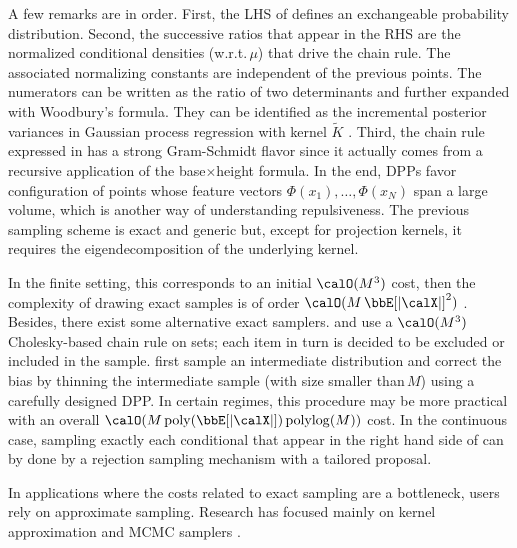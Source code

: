 \documentclass[twoside,11pt]{article}
\begin{document}
        A few remarks are in order.
        First, the LHS of  defines an exchangeable probability distribution.
        Second, the successive ratios that appear in the RHS are the normalized conditional densities (w.r.t.\,$\mu$) that drive the chain rule.
        The associated normalizing constants are independent of the previous points.
        The numerators can be written as the ratio of two determinants and further expanded with Woodbury's formula.
        They can be identified as the incremental posterior variances in Gaussian process regression with kernel $\tilde{K}$ \citep[Equation\,2.26]{RaWi06}.
        Third, the chain rule expressed in  has a strong Gram-Schmidt flavor since it actually comes from a recursive application of the base$\times$height formula.
        In the end, DPPs favor configuration of points whose feature vectors $\Phi(x_1),\dots, \Phi(x_N)$ span a large volume, which is another way of understanding repulsiveness.
        The previous sampling scheme is exact and generic but, except for projection kernels, it requires the eigendecomposition of the underlying kernel.

        In the finite setting, this corresponds to an initial $\calO(M^3)$ cost, then the complexity of drawing exact samples is of order $\calO(M\Expe{|\calX|}^2)$
        \citep[see, e.g.,][]{Gil14,TrBaAm18}.
        Besides, there exist some alternative exact samplers.
        \citet{Pou19} and  use a $\calO(M^3)$ Cholesky-based chain rule on sets; each item in turn is decided to be excluded or included in the sample.
         first sample an intermediate distribution and correct the bias by thinning the intermediate sample (with size smaller than\,$M$) using a carefully designed DPP.
        In certain regimes, this procedure may be more practical with an overall
        $\calO(M\operatorname{poly}(\Expe{|\calX|})\operatorname{polylog}(M))$ cost.
        In the continuous case, sampling exactly each conditional that appear in the right hand side of  can by done by a rejection sampling mechanism with a tailored proposal.

        In applications where the costs related to exact sampling are a bottleneck, users rely on approximate sampling.
        Research has focused mainly on kernel approximation \citep{AKFT13} and MCMC samplers \citep{AnGhRe16, LiJeSr16c, GaBaVa17}.
\end{document}
